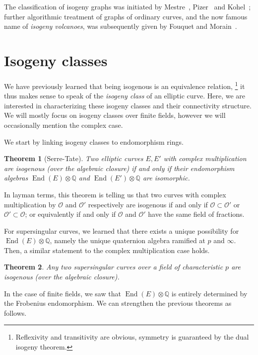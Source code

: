 \documentclass[10pt]{article}
\theoremstyle{plain}
\newtheorem{theorem}{Theorem}
\theoremstyle{definition}
\DeclareMathOperator{\End}{End} %
\def\O{\ensuremath{\mathcal{O}}}
\begin{document}
\begin{prposition}
The classification of isogeny graphs was initiated by
Mestre~\cite{mestre86}, Pizer~\cite{pizer1,pizer2} and
Kohel~\cite{kohel}; further algorithmic treatment of graphs of
ordinary curves, and the now famous name of \emph{isogeny volcanoes},
was subsequently given by Fouquet and
Morain~\cite{fouquet+morain02}. %


\section{Isogeny classes}

We have previously learned that being isogenous is an equivalence
relation,%
\footnote{Reflexivity and transitivity are obvious, symmetry is
  guaranteed by the dual isogeny theorem.} %
it thus makes sense to speak of the \emph{isogeny class} of an elliptic
curve. %
Here, we are interested in characterizing these isogeny classes and
their connectivity structure. %
We will mostly focus on isogeny classes over finite fields, however we
will occasionally mention the complex case.

We start by linking isogeny classes to endomorphism rings.

\begin{theorem}[Serre-Tate]
  \label{th:serre-tate}
  Two elliptic curves $E,E'$ with complex multiplication are isogenous
  (over the algebraic closure) if and only if their \emph{endomorphism
    algebras} $\End(E)⊗ℚ$ and $\End(E')⊗ℚ$ are isomorphic.
\end{theorem}

In layman terms, this theorem is telling us that two curves with
complex multiplication by $\O$ and $\O'$ respectively are isogenous
if and only if $\O⊂\O'$ or $\O'⊂\O$; or equivalently if and only if
$\O$ and $\O'$ have the same field of fractions.

For supersingular curves, we learned that there exists a unique
possibility for $\End(E)⊗ℚ$, namely the unique quaternion algebra
ramified at $p$ and $∞$. %
Then, a similar statement to the complex multiplication case holds.

\begin{theorem}
  \label{th:ssingular-serre-tate}
  Any two supersingular curves over a field of characteristic $p$ are
  isogenous (over the algebraic closure).
\end{theorem}

In the case of finite fields, we saw that $\End(E)⊗ℚ$ is entirely
determined by the Frobenius endomorphism. %
We can strengthen the previous theorems as follows.


\end{prposition}
\end{document}
